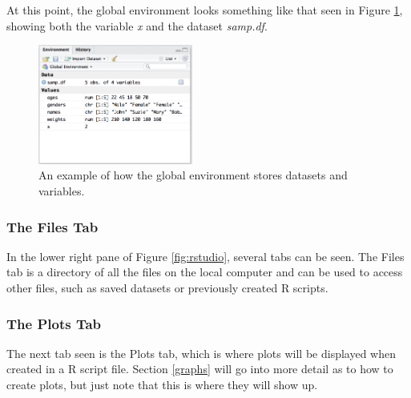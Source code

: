 
\begin{knitrout}
\color{fgcolor}\begin{kframe}
\begin{alltt}
\hlstd{(}\hlstd{)}
\end{alltt}
\end{kframe}
\end{knitrout}


At this point, the global environment looks something like that seen in Figure \ref{fig:rstudioenv}, showing both the variable \textit{x} and the dataset \textit{samp.df}.  
\begin{figure}[h!]
\centering
\includegraphics[width = 2in]{chapters/chapter_0/rstudioenv.png}
\caption{An example of how the global environment stores datasets and variables.}
\label{fig:rstudioenv}
\end{figure}


\subsubsection{The Files Tab}
In the lower right pane of Figure \ref{fig:rstudio}, several tabs can be seen.  The Files tab is a directory of all the files on the local computer and can be used to access other files, such as saved datasets or previously created \textsf{R} scripts.  

\subsubsection{The Plots Tab} 
The next tab seen is the Plots tab, which is where plots will be displayed when created in a R script file.  Section \ref{graphs} will go into more detail as to how to create plots, but just note that this is where they will show up.  

